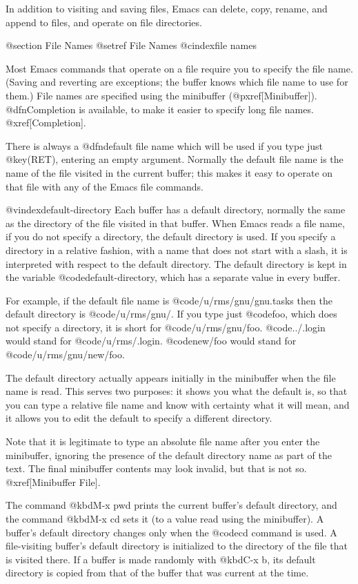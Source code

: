 {{{{{{{{{{{{{{{{{{  In addition to visiting and saving files, Emacs can delete, copy, rename,
and append to files, and operate on file directories.

@section File Names
@setref File Names
@cindex{file names}

  Most Emacs commands that operate on a file require you to specify the
file name.  (Saving and reverting are exceptions; the buffer knows which
file name to use for them.)  File names are specified using the minibuffer
(@pxref[Minibuffer]).  @dfn{Completion} is available, to make it easier to
specify long file names.  @xref[Completion].

  There is always a @dfn{default file name} which will be used if you type
just @key(RET), entering an empty argument.  Normally the default file
name is the name of the file visited in the current buffer; this makes it
easy to operate on that file with any of the Emacs file commands.

@vindex{default-directory}
  Each buffer has a default directory, normally the same as the
directory of the file visited in that buffer.  When Emacs reads a file
name, if you do not specify a directory, the default directory is
used.  If you specify a directory in a relative fashion, with a name
that does not start with a slash, it is interpreted with respect to
the default directory.  The default directory is kept in the variable
@code{default-directory}, which has a separate value in every buffer.

  For example, if the default file name is @code{/u/rms/gnu/gnu.tasks} then
the default directory is @code{/u/rms/gnu/}.  If you type just @code{foo},
which does not specify a directory, it is short for @code{/u/rms/gnu/foo}.
@code{../.login} would stand for @code{/u/rms/.login}.  @code{new/foo}
would stand for @code{/u/rms/gnu/new/foo}.

  The default directory actually appears initially in the minibuffer when
the file name is read.  This serves two purposes: it shows you what the
default is, so that you can type a relative file name and know with
certainty what it will mean, and it allows you to edit the default to
specify a different directory.

  Note that it is legitimate to type an absolute file name after you
enter the minibuffer, ignoring the presence of the default directory name
as part of the text.  The final minibuffer contents may look invalid, but
that is not so.  @xref[Minibuffer File].

  The command @kbd{M-x pwd} prints the current buffer's default directory,
and the command @kbd{M-x cd} sets it (to a value read using the minibuffer).
A buffer's default directory changes only when the @code{cd} command is used.
A file-visiting buffer's default directory is initialized to the directory
of the file that is visited there.  If a buffer is made randomly with
@kbd{C-x b}, its default directory is copied from that of the buffer that
was current at the time.

}}}}}}}}}}}}}}}}}}
